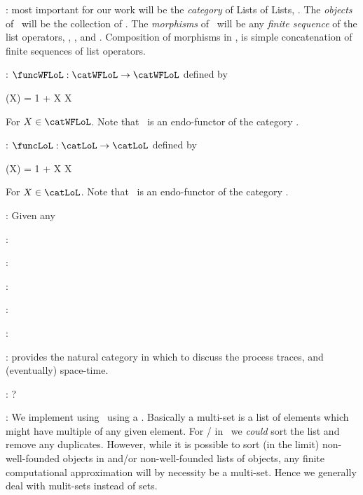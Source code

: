 \item {}: most important for our work will be 
the \emph{category} of Lists of Lists, \catLoL. The \emph{objects} of 
\catLoL\ will be the collection of \lols. The \emph{morphisms} of 
\catLoL\ will be any \emph{finite sequence} of the list operators, 
, ,  and . Composition of 
morphisms in \catLoL, is simple concatenation of finite sequences of list 
operators. 

\item {}: $\funcWFLoL : \catWFLoL \rightarrow \catWFLoL$ 
defined by 

\placeformula[+]\startformula
  \funcWFLoL(X) = 1 + X \times X
\stopformula

\noindent For $X \in \catWFLoL$. Note that \funcWFLoL\ is an endo-functor of 
the category \catWFLoL. 

\item {}: $\funcLoL : \catLoL \rightarrow \catLoL$ 
defined by 

\placeformula[+]\startformula
  \funcLoL(X) = 1 + X \times X
\stopformula

\noindent For $X \in \catLoL$. Note that \funcLoL\ is an endo-functor of 
the category \catLoL. 

\item {}: Given any 

\item {}:

\item {}:

\item {}:

\item {}:

\item {}:

\item {}: provides the natural 
category in which to discuss the process traces, and (eventually) space-time.

\item {}: ?

\item {}: We implement  using \lols\ using a 
. Basically a multi-set is a list of elements which might 
have multiple  of any given element. For 
/ in \wflol\ we \emph{could} sort the list 
and remove any duplicates. However, while it is possible to sort (in the 
limit) non-well-founded objects in \lol and/or non-well-founded lists of 
objects, any finite computational approximation will by necessity be a 
multi-set. Hence we generally deal with mulit-sets instead of sets. 

